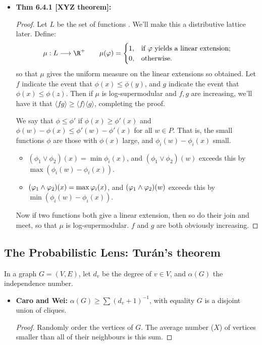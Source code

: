 \documentclass[11pt]{article}
\newenvironment{INT}[1][]{\begin{itemize}\small\item\textbf{#1}}{\end{itemize}}
\begin{document}
\begin{chapter6}
\begin{itemise}
\begin{INT}[Thm 6.4.1 {[XYZ theorem]}:]
\begin{proof}
\INDENT Let $L$ be the set of functions . We'll make this a distributive lattice later. Define:
\[\mu:L\to\R^+\qquad \mu(\phi)=\begin{cases}
1,&\textup{if $\phi$ yields a linear extension};\\
0,&\textup{otherwise}.
\end{cases}\]
so that $\mu$ gives the uniform measure on the linear extensions so obtained. Let $f$ indicate the event that $\phi(x)\leq \phi(y)$, and $g$ indicate the event that $\phi(x)\leq \phi(z)$. Then if $\mu$ is log-supermodular and $f,g$ are increasing, we'll have it that $\langle fg\rangle\geq\langle f\rangle\langle g\rangle$, completing the proof.

\INDENT %
We say that $\phi\leq\phi'$ if $\phi(x)\geq\phi'(x)$ and $\phi(w)-\phi(x)\leq\phi'(w)-\phi'(x)$ for all $w\in P$. That is, the small functions $\phi$ are those with $\phi(x)$ large, and $\phi_i(w)-\phi_i(x)$ small.
\begin{itemize}\squishlist
\item $(\phi_1\vee\phi_2)(x)=\min\phi_i(x)$, and $(\phi_1\vee\phi_2)(w)$ exceeds this by $\max (\phi_i(w)-\phi_i(x))$.
\item $(\varphi_1\wedge\varphi_2)(x)=\max\varphi_i(x)$, and $(\varphi_1\wedge\varphi_2)(w)$ exceeds this by $\min (\phi_i(w)-\phi_i(x))$.
\end{itemize}
Now if two functions both give a linear extension, then so do their join and meet, so that $\mu$ is log-supermodular. $f$ and $g$ are both obviously increasing.
\end{proof}
\end{INT}
\end{itemise}
\subsection*{The Probabilistic Lens: Tur\'an's theorem}
In a graph $G=(V,E)$, let $d_v$ be the degree of $v\in V$, and $\alpha(G)$ the independence number.
\begin{INT}[Caro and Wei:]
$\alpha(G)\geq\displaystyle\sum(d_v+1)^{-1}$, with equality \Iff $G$ is a disjoint union of cliques.
\begin{proof}
Randomly order the vertices of $G$. The average number ($X$) of vertices smaller than all of their neighbours is this sum.


\end{proof}
\end{INT}
\end{chapter6}
\end{document}
